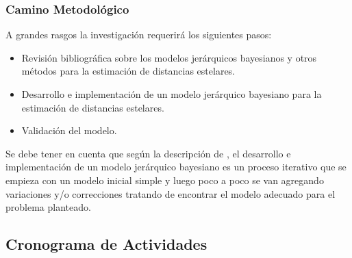 \documentclass[stu, 12pt, letterpaper, donotrepeattitle, floatsintext, natbib]{apa7_ula}
\begin{document}
\subsubsection{Camino Metodológico}

A grandes rasgos la investigación requerirá los siguientes pasos:

\begin{itemize}
    \item Revisión bibliográfica sobre los modelos jerárquicos bayesianos y otros métodos para la estimación de distancias estelares.
    \item Desarrollo e implementación de un modelo jerárquico bayesiano para la estimación de distancias estelares.
    \item Validación del modelo.
\end{itemize}

Se debe tener en cuenta que según la descripción de
\citet{gelman2020bayesian}, el desarrollo e implementación de un
modelo jerárquico bayesiano es un proceso iterativo que se empieza
con un modelo inicial simple y luego poco a poco se van agregando
variaciones y/o correcciones tratando de encontrar el modelo
adecuado para el problema planteado.

\subsection{Cronograma de Actividades}
\end{document}
